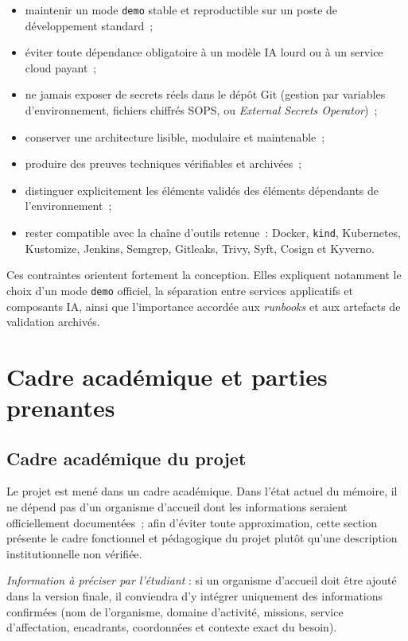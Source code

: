 \begin{itemize}
    \item maintenir un mode \texttt{demo} stable et reproductible sur un poste de développement standard~;
    \item éviter toute dépendance obligatoire à un modèle IA lourd ou à un service cloud payant~;
    \item ne jamais exposer de secrets réels dans le dépôt Git (gestion par variables d'environnement, fichiers chiffrés SOPS, ou \textit{External Secrets Operator})~;
    \item conserver une architecture lisible, modulaire et maintenable~;
    \item produire des preuves techniques vérifiables et archivées~;
    \item distinguer explicitement les éléments validés des éléments dépendants de l'environnement~;
    \item rester compatible avec la chaîne d'outils retenue~: Docker, \texttt{kind}, Kubernetes, Kustomize, Jenkins, Semgrep, Gitleaks, Trivy, Syft, Cosign et Kyverno.
\end{itemize}

Ces contraintes orientent fortement la conception. Elles expliquent notamment le choix d'un mode \texttt{demo} officiel, la séparation entre services applicatifs et composants IA, ainsi que l'importance accordée aux \textit{runbooks} et aux artefacts de validation archivés.

\section{Cadre académique et parties prenantes}
\label{sec:cadre_acad}

\subsection{Cadre académique du projet}

Le projet est mené dans un cadre académique. Dans l'état actuel du mémoire, il ne dépend pas d'un organisme d'accueil dont les informations seraient officiellement documentées~; afin d'éviter toute approximation, cette section présente le cadre fonctionnel et pédagogique du projet plutôt qu'une description institutionnelle non vérifiée.

\textit{Information à préciser par l'étudiant} : si un organisme d'accueil doit être ajouté dans la version finale, il conviendra d'y intégrer uniquement des informations confirmées (nom de l'organisme, domaine d'activité, missions, service d'affectation, encadrants, coordonnées et contexte exact du besoin).

